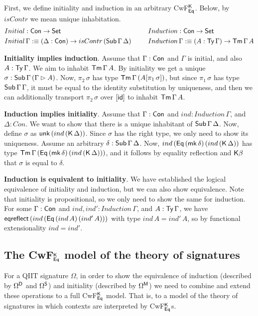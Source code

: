 \documentclass[acmsmall,review,anonymous]{acmart}\settopmatter{printfolios=true,printccs=false,printacmref=false}
\begin{document}
First, we define initiality and induction in an arbitrary CwF$^\K_{\Eq}$. Below, by $isContr$ we mean unique inhabitation.
\begin{alignat*}{5}
  & Initial : \Con \ra \Set && \hspace{1.5em}Induction : \Con \ra \Set \\
  & Initial\,\Gamma :\equiv (\Delta : \Con) \ra isContr\,(\Tms\,\Gamma\,\Delta) && \hspace{1.5em}Induction\,\Gamma :\equiv (A : \Ty\,\Gamma)\ra\Tm\,\Gamma\,A
\end{alignat*}

\textbf{Initiality implies induction}. Assume that $\Gamma : \Con$ and
$\Gamma$ is initial, and also $A : \Ty\,\Gamma$. We aim to inhabit
$\Tm\,\Gamma\,A$. By initiality we get a unique $\sigma :
\Sub\,\Gamma\,(\Gamma \rhd A)$. Now, $\pi_2\,\sigma$ has type
$\Tm\,\Gamma\,(A[\pi_1\,\sigma])$, but since $\pi_1\,\sigma$ has type
$\Tms\,\Gamma\,\Gamma$, it must be equal to the identity substitution
by uniqueness, and then we can additionally transport
$\pi_2\,\sigma$ over $[\id]$ to inhabit $\Tm\,\Gamma\,A$.

\textbf{Induction implies initiality}. Assume that $\Gamma : \Con$ and
$ind : Induction\,\Gamma$, and $\Delta : Con$. We want to show that
there is a unique inhabitant of $\Tms\,\Gamma\,\Delta$. Now, define
$\sigma$ as $\unk\,(ind\,(\K\,\Delta))$. Since $\sigma$ has the right
type, we only need to show its uniqueness. Assume an arbitrary $\delta
: \Tms\,\Gamma\,\Delta$. Now,
$ind\,(\Eq\,(\mk\,\delta)\,(ind\,(\K\,\Delta))$ has type
$\Tm\,\Gamma\,(\Eq\,(\mk\,\delta)\,(ind\,(\K\,\Delta)))$, and it
follows by equality reflection and $\K\beta$ that $\sigma$ is equal to
$\delta$.

\textbf{Induction is equivalent to initiality}. We have established
the logical equivalence of initiality and induction, but we can also
show equivalence. Note that initiality is propositional, so we only
need to show the same for induction. For some $\Gamma : \Con$ and
$ind, ind' : Induction\,\Gamma$, and $A : \Ty\,\Gamma$, we have
$\eqreflect\,(ind\,(\Eq\,(ind\,A)\,(ind'\,A)))$ with type $ind\,A =
ind'\,A$, so by functional extensionality $ind = ind'$.

\subsection{The CwF$^\K_{\Eq}$ model of the theory of signatures}
\label{sec:cwfmodel}

For a QIIT signature $\Omega$, in order to show the equivalence of
induction (described by $\Omega^\D$ and $\Omega^\S$) and initiality
(described by $\Omega^\M$) we need to combine and extend these
operations to a full CwF$^\K_{\Eq}$ model. That is, to a model of the
theory of signatures in which contexts are interpreted by
CwF$^\K_{\Eq}$s.
\end{document}
